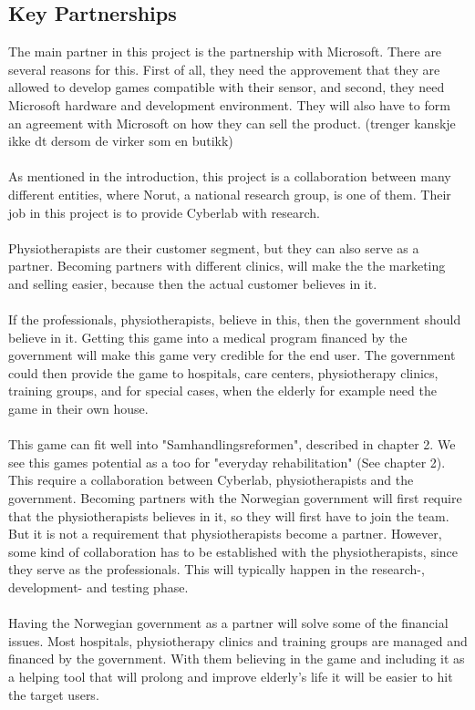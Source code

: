 \subsection{Key Partnerships}
The main partner in this project is the partnership with Microsoft. There are several reasons for this. First of all, they need the approvement that they are allowed to develop games compatible with their sensor, and second, they need Microsoft hardware and development environment. They will also have to form an agreement with Microsoft on how they can sell the product. (trenger kanskje ikke dt dersom de virker som en butikk) \\ \\ As mentioned in the introduction, this project is a collaboration between many different entities, where Norut, a national research group, is one of them. Their job in this project is to provide Cyberlab with research. \\ \\ Physiotherapists are their customer segment, but they can also serve as a partner. Becoming partners with different clinics, will make the the marketing and selling easier, because then the actual customer believes in it. \\ \\ If the professionals, physiotherapists, believe in this, then the government should believe in it. Getting this game into a medical program financed by the government will make this game very credible for the end user. The government could then provide the game to hospitals, care centers, physiotherapy clinics, training groups, and for special cases, when the elderly for example need the game in their own house. \\ \\ This game can fit well into "Samhandlingsreformen", described in chapter 2. We see this games potential as a too for "everyday rehabilitation" (See chapter 2). This require a collaboration between Cyberlab, physiotherapists and the government. Becoming partners with the Norwegian government will first require that the physiotherapists believes in it, so they will first have to join the team. But it is not a requirement that physiotherapists become a partner. However, some kind of collaboration has to be established with the physiotherapists, since they serve as the professionals. This will typically happen in the research-, development- and testing phase.  \\ \\ Having the Norwegian government as a partner will solve some of the financial issues. Most hospitals, physiotherapy clinics and training groups are managed and financed by the government. With them believing in the game and including it as a helping tool that will prolong and improve elderly's life it will be easier to hit the target users. 
